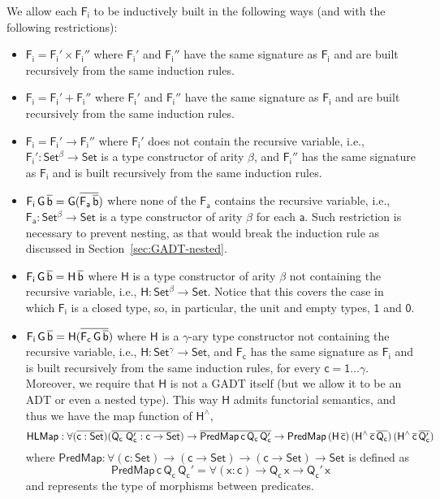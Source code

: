 \documentclass[acmsmall,screen,review,anonymous]{acmart}
\theoremstyle{definition}
\begin{document}
We allow each $\mathsf{F_i}$ to be inductively built in the following ways (and with the following restrictions):
\begin{itemize}
\item $\mathsf{F_i = F_i' \times F_i''}$ where $\mathsf{F_i'}$ and $\mathsf{F_i''}$ have the same signature as $\mathsf{F_i}$ and are built recursively from the same induction rules.
\item $\mathsf{F_i = F_i' + F_i''}$ where $\mathsf{F_i'}$ and $\mathsf{F_i''}$ have the same signature as $\mathsf{F_i}$ and are built recursively from the same induction rules.
\item $\mathsf{F_i = F_i' \to F_i''}$
where $\mathsf{F_i'}$ does not contain the recursive variable,
i.e., $\mathsf{F_i' : Set^\beta \to Set}$ is a type constructor of arity $\mathsf{\beta}$,
and $\mathsf{F_i''}$ has the same signature as $\mathsf{F_i}$ and is built recursively from the same induction rules.
\item $\mathsf{F_i\,G\,\overline{b} = G(\overline{F_a\,\overline{b}})}$
where none of the $\mathsf{F_a}$ contains the recursive variable,
i.e., $\mathsf{F_a : Set^\beta \to Set}$
is a type constructor of arity $\mathsf{\beta}$
for each $\mathsf{a}$.
Such restriction is necessary to prevent nesting,
as that would break the induction rule as discussed in Section~\ref{sec:GADT-nested}.
\item $\mathsf{F_i\,G\,\overline{b} = H\,\overline{b}}$
where $\mathsf{H}$ is a type constructor of arity $\mathsf{\beta}$ not containing the recursive variable,
i.e., $\mathsf{H : Set^\beta \to Set}$.
Notice that this covers the case in which $\mathsf{F_i}$ is a closed type,
so, in particular, the unit and empty types, $\mathsf{1}$ and $\mathsf{0}$.
\item $\mathsf{F_i\,G\,\overline{b} = H (\overline{F_c\,G\,\overline{b}})}$
where $\mathsf{H}$ is a $\mathsf{\gamma}$-ary type constructor not containing the recursive variable,
i.e., $\mathsf{H : Set^\gamma \to Set}$,
and $\mathsf{F_c}$ has the same signature as $\mathsf{F_i}$  and is built recursively from the same induction rules, for every $\mathsf{c = 1 \dots \gamma}$.
Moreover, we require that $\mathsf{H}$ is not a GADT itself (but we allow it to be an ADT or even a nested type).
This way $\mathsf{H}$ admits functorial semantics, and thus we have the map function of $\mathsf{H^{\wedge}}$,
\[
\mathsf{HLMap : \forall (\overline{c : Set}) (\overline{Q_c\;Q_c' : c \to Set})
	\to \overline{PredMap\,c\,Q_c\,Q_c'}
	\to PredMap\,(H\,\overline{c})\,(H^{\wedge}\,\overline{c}\,\overline{Q_c})\,(H^{\wedge}\,\overline{c}\,\overline{Q_c'})}
\]
where $\mathsf{PredMap : \forall (c : Set) \to (c \to Set) \to (c \to Set) \to Set}$
is defined as
\[
\mathsf{PredMap\,c\,Q_c\,Q_c' = \forall (x : c) \to Q_c\,x \to Q_c'\,x}
\]
and represents the type of morphisms between predicates.
\end{itemize}
\end{document}
